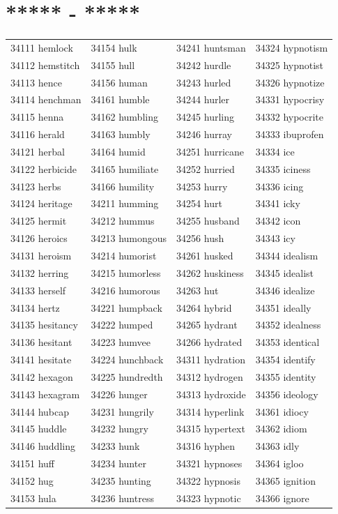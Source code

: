\documentclass[10pt, oneside]{book}
\begin{document}
\begin{table}[h]
	\centering
	\section*{***** - *****}
	\begin{tabular}{l l l l}
34111 hemlock &34154 hulk &34241 huntsman &34324 hypnotism\\
34112 hemstitch &34155 hull &34242 hurdle &34325 hypnotist\\
34113 hence &34156 human &34243 hurled &34326 hypnotize\\
34114 henchman &34161 humble &34244 hurler &34331 hypocrisy\\
34115 henna &34162 humbling &34245 hurling &34332 hypocrite\\
34116 herald &34163 humbly &34246 hurray &34333 ibuprofen\\
34121 herbal &34164 humid &34251 hurricane &34334 ice\\
34122 herbicide &34165 humiliate &34252 hurried &34335 iciness\\
34123 herbs &34166 humility &34253 hurry &34336 icing\\
34124 heritage &34211 humming &34254 hurt &34341 icky\\
34125 hermit &34212 hummus &34255 husband &34342 icon\\
34126 heroics &34213 humongous &34256 hush &34343 icy\\
34131 heroism &34214 humorist &34261 husked &34344 idealism\\
34132 herring &34215 humorless &34262 huskiness &34345 idealist\\
34133 herself &34216 humorous &34263 hut &34346 idealize\\
34134 hertz &34221 humpback &34264 hybrid &34351 ideally\\
34135 hesitancy &34222 humped &34265 hydrant &34352 idealness\\
34136 hesitant &34223 humvee &34266 hydrated &34353 identical\\
34141 hesitate &34224 hunchback &34311 hydration &34354 identify\\
34142 hexagon &34225 hundredth &34312 hydrogen &34355 identity\\
34143 hexagram &34226 hunger &34313 hydroxide &34356 ideology\\
34144 hubcap &34231 hungrily &34314 hyperlink &34361 idiocy\\
34145 huddle &34232 hungry &34315 hypertext &34362 idiom\\
34146 huddling &34233 hunk &34316 hyphen &34363 idly\\
34151 huff &34234 hunter &34321 hypnoses &34364 igloo\\
34152 hug &34235 hunting &34322 hypnosis &34365 ignition\\
34153 hula &34236 huntress &34323 hypnotic &34366 ignore\\
	\end{tabular}
 \end{table}
\end{document}
